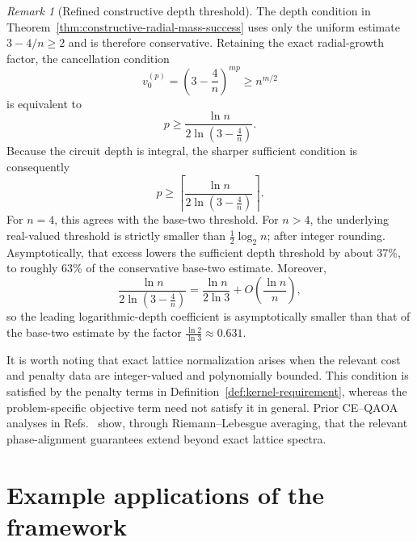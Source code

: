 \documentclass[a4paper,onecolumn,11pt,unpublished]{quantumarticle}
\theoremstyle{remark}
\newtheorem{remark}[theorem]{Remark}
\begin{document}
\begin{remark}[Refined constructive depth threshold]
\label{rem:refined-constructive-depth-threshold}
The depth condition in
Theorem~\ref{thm:constructive-radial-mass-success}
uses only the uniform estimate
\(
3-4/n\ge2
\)
and is therefore conservative. Retaining the exact radial-growth
factor, the cancellation condition
\[
v_0^{(p)}
=
\left(3-\frac{4}{n}\right)^{mp}
\ge
n^{m/2}
\]
is equivalent to
\[
p
\ge
\frac{\ln n}
     {2\ln\!\left(3-\frac{4}{n}\right)}.
\]
Because the circuit depth is integral, the sharper sufficient
condition is consequently
\[
p
\ge
\left\lceil
\frac{\ln n}
     {2\ln\!\left(3-\frac{4}{n}\right)}
\right\rceil.
\]
For \(n=4\), this agrees with the base-two threshold. For \(n>4\),
the underlying real-valued threshold is strictly smaller than
\(\frac12\log_2 n\); after integer rounding. Asymptotically, that excess lowers the sufficient depth threshold by about 37\%, to roughly 63\% of the conservative base-two estimate. Moreover,
\[
\frac{\ln n}
     {2\ln\!\left(3-\frac{4}{n}\right)}
=
\frac{\ln n}{2\ln 3}
+
O\!\left(\frac{\ln n}{n}\right),
\]
so the leading logarithmic-depth coefficient is asymptotically
smaller than that of the base-two estimate by the factor
\(
\frac{\ln 2}{\ln 3}
\approx
0.631.
\)

\end{remark}





It is worth noting that exact lattice normalization arises when the relevant cost and penalty data are integer-valued and polynomially bounded. This condition is satisfied by the penalty terms in
Definition~\ref{def:kernel-requirement}, whereas the problem-specific
objective term need not satisfy it in general. Prior CE--QAOA analyses in Refs.~\cite{onahfund,onahfinite} show, through Riemann--Lebesgue averaging, that the relevant phase-alignment guarantees extend beyond exact lattice spectra.







\section{Example applications of the framework}
\label{sec:applications}
\end{document}
